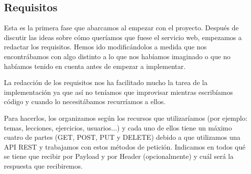 \subsection{Requisitos}
Esta es la primera fase que abarcamos al empezar con el proyecto. Después de discutir las ideas sobre cómo queríamos que fuese el servicio web, empezamos a redactar los requisitos. Hemos ido modificándolos a medida que nos encontrábamos con algo distinto a lo que nos habíamos imaginado o que no habíamos tenido en cuenta antes de empezar a implementar.
\vspace{1em}

La redacción de los requisitos nos ha facilitado mucho la tarea de la implementación ya que así no teníamos que improvisar mientras escribíamos código y cuando lo necesitábamos recurríamos a ellos.
\vspace{1em}

Para hacerlos, los organizamos según los recursos que utilizaríamos (por ejemplo: temas, lecciones, ejercicios, usuarios...) y cada uno de ellos tiene un máximo cuatro de partes (GET, POST, PUT y DELETE) debido a que utilizamos una API REST y trabajamos con estos métodos de petición. Indicamos en todos qué se tiene que recibir por Payload y por Header (opcionalmente) y cuál será la respuesta que recibiremos.

